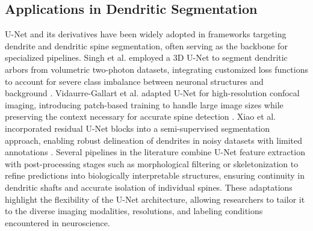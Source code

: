 
\subsection{Applications in Dendritic Segmentation}
U-Net and its derivatives have been widely adopted in frameworks targeting dendrite and dendritic spine segmentation, often serving as the backbone for specialized pipelines. Singh et al. employed a 3D U-Net to segment dendritic arbors from volumetric two-photon datasets, integrating customized loss functions to account for severe class imbalance between neuronal structures and background \cite{Singh_2017}. Vidaurre-Gallart et al. adapted U-Net for high-resolution confocal imaging, introducing patch-based training to handle large image sizes while preserving the context necessary for accurate spine detection \cite{Vidaurre_2022}. Xiao et al. incorporated residual U-Net blocks into a semi-supervised segmentation approach, enabling robust delineation of dendrites in noisy datasets with limited annotations \cite{Xiao_2018}. Several pipelines in the literature combine U-Net feature extraction with post-processing stages such as morphological filtering or skeletonization to refine predictions into biologically interpretable structures, ensuring continuity in dendritic shafts and accurate isolation of individual spines. These adaptations highlight the flexibility of the U-Net architecture, allowing researchers to tailor it to the diverse imaging modalities, resolutions, and labeling conditions encountered in neuroscience.

